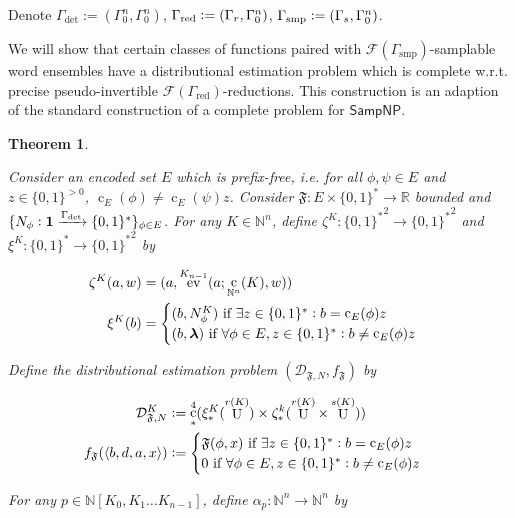 \documentclass{article}
\numberwithin{equation}{section}
\theoremstyle{definition}
\theoremstyle{plain}
\newtheorem{theorem}{Theorem}[section]
\newcommand{\Bool}{\{0,1\}}
\newcommand{\Words}{{\Bool^*}}
\DeclareMathOperator{\Ev}{ev}
\DeclareMathOperator{\Un}{U}
\DeclareMathOperator{\En}{c}
\newcommand{\Nats}{\mathbb{N}}
\newcommand{\Reals}{\mathbb{R}}
\newcommand{\NatPoly}{\Nats[K_0, K_1 \ldots K_{n-1}]}
\newcommand{\NatFun}{\Nats^n \rightarrow}
\newcommand{\Estr}{\bm{\lambda}}
\newcommand{\Chev}[1]{\langle #1 \rangle}
\newcommand{\Dist}{\mathcal{D}}
\newcommand{\Fall}{\mathcal{F}}
\begin{document}
Denote ${\Gamma_\text{det}:=(\Gamma_0^n,\Gamma_0^n)}$, ${\Gamma_{\textnormal{red}}:=(\Gamma_{r},\Gamma_0^n)}$, ${\Gamma_{\textnormal{smp}}:=(\Gamma_{s},\Gamma_0^n)}$.

We will show that certain classes of functions paired with ${\Fall(\Gamma_{\text{smp}})}$-samplable word ensembles have a distributional estimation problem which is complete w.r.t. precise pseudo-invertible ${\Fall(\Gamma_{\text{red}})}$-reductions. This construction is an adaption of the standard construction of a complete problem for ${\mathsf{SampNP}}$.

\begin{samepage}
\begin{theorem}
\label{thm:complete}

Consider an encoded set ${E}$ which is prefix-free, i.e. for all ${\phi,\psi \in E}$ and ${z \in \Bool^{>0}}$, ${\En_E(\phi) \ne \En_E(\psi)z}$. Consider ${\mathfrak{F}: E \times \Words \rightarrow \Reals}$ bounded and ${\{N_\phi: \bm{1} \xrightarrow{\Gamma_{\textnormal{det}}} \Words\}_{\phi \in E}}$. For any ${K \in \Nats^n}$, define ${\zeta^K: \Words^2 \rightarrow \Words^2}$ and ${\xi^K: \Words \rightarrow \Words^2}$ by 

\begin{align}
\zeta^K(a,w)&=(a,\Ev^{K_{n-1}}(a;\En_{\Nats^n}(K),w))\\
\xi^K(b)&=\begin{cases}(b,N_\phi^K) \textnormal{ if } \exists z \in \Words: b=\En_E(\phi)z \\ (b,\Estr) \textnormal{ if } \forall \phi \in E, z \in \Words: b \ne \En_E(\phi)z\end{cases}
\end{align}

Define the distributional estimation problem $({\Dist_{\mathfrak{F},N}},f_{\mathfrak{F}})$ by 

\begin{align}
\Dist_{\mathfrak{F},N}^K&:=\En_*^4 (\xi_*^K(\Un^{r(K)}) \times \zeta_*^k(\Un^{r(K)} \times \Un^{s(K)})) \\
f_{\mathfrak{F}}(\Chev{b,d,a,x}) &:= \begin{cases}\mathfrak{F}(\phi, x) \textnormal{ if } \exists z \in \Words: b=\En_E(\phi)z \\ 0 \textnormal{ if } \forall \phi \in E, z \in \Words: b \ne \En_E(\phi)z\end{cases}
\end{align}

For any ${p \in \NatPoly}$, define ${\alpha_p: \NatFun \Nats^n}$ by


\end{theorem}
\end{samepage}
\end{document}
